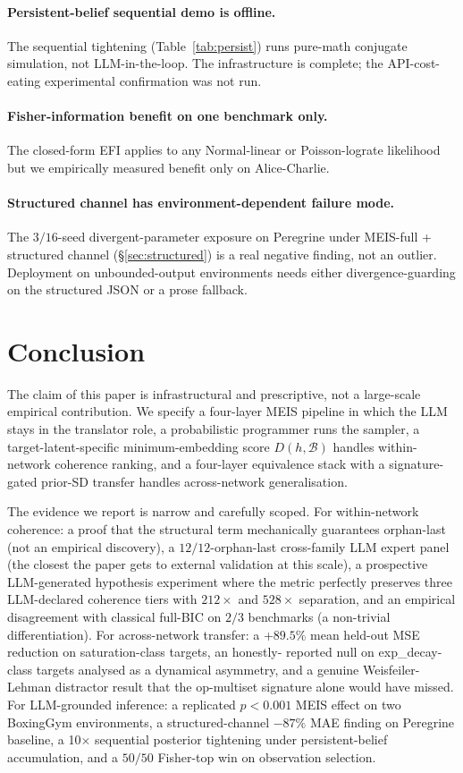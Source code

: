\documentclass{article}
\begin{document}
\paragraph{Persistent-belief sequential demo is offline.} The
sequential tightening (Table~\ref{tab:persist}) runs pure-math
conjugate simulation, not LLM-in-the-loop. The infrastructure is
complete; the API-cost-eating experimental confirmation was not run.

\paragraph{Fisher-information benefit on one benchmark only.} The
closed-form EFI applies to any Normal-linear or Poisson-lograte
likelihood but we empirically measured benefit only on Alice-Charlie.

\paragraph{Structured channel has environment-dependent failure
mode.} The $3 / 16$-seed divergent-parameter exposure on Peregrine
under MEIS-full + structured channel (\S\ref{sec:structured}) is a
real negative finding, not an outlier. Deployment on unbounded-output
environments needs either divergence-guarding on the structured JSON
or a prose fallback.

\section{Conclusion}
\label{sec:conclusion}

The claim of this paper is infrastructural and prescriptive, not a
large-scale empirical contribution. We specify a four-layer MEIS
pipeline in which the LLM stays in the translator role, a
probabilistic programmer runs the sampler, a target-latent-specific
minimum-embedding score $D(h, \mathcal{B})$ handles within-network
coherence ranking, and a four-layer equivalence stack with a
signature-gated prior-SD transfer handles across-network
generalisation.

The evidence we report is narrow and carefully scoped. For
within-network coherence: a proof that the structural term
mechanically guarantees orphan-last (not an empirical discovery), a
$12/12$-orphan-last cross-family LLM expert panel (the closest the
paper gets to external validation at this scale), a prospective
LLM-generated hypothesis experiment where the metric perfectly
preserves three LLM-declared coherence tiers with $212\times$ and
$528\times$ separation, and an empirical disagreement with
classical full-BIC on $2/3$ benchmarks (a non-trivial
differentiation). For across-network transfer: a +$89.5\%$ mean
held-out MSE reduction on saturation-class targets, an honestly-
reported null on exp\_decay-class targets analysed as a dynamical
asymmetry, and a genuine Weisfeiler-Lehman distractor result that
the op-multiset signature alone would have missed. For LLM-grounded
inference: a replicated $p < 0.001$ MEIS effect on two BoxingGym
environments, a structured-channel $-87\%$ MAE finding on Peregrine
baseline, a 10$\times$ sequential posterior tightening under
persistent-belief accumulation, and a $50/50$ Fisher-top win on
observation selection.
\end{document}
